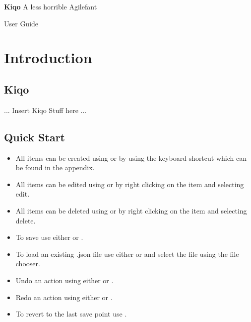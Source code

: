\documentclass[11pt,fleqn]{book} %
\begin{document}

\begingroup
\thispagestyle{empty}
\centering
\vspace*{5cm}
\par\normalfont\fontsize{35}{35}\sffamily\selectfont
\textbf{Kiqo}
{\LARGE A less horrible Agilefant}\par %
\vspace*{1cm}
{\Huge User Guide}\par %
\endgroup


\tableofcontents %

\chapter{Introduction}

\section{Kiqo}
... Insert Kiqo Stuff here ...

\section{Quick Start}
\begin{itemize}
    \item All items can be created using  or by using the keyboard shortcut which can be found
    in the appendix.
    \item All items can be edited using  or by right clicking on the item and selecting edit.
    \item All items can be deleted using  or by right clicking on the item and selecting delete.
    \item To save use either  or .
    \item To load an existing .json file use either  or  and select the file using the file chooser.
    \item Undo an action using either  or .
    \item Redo an action using either  or .
    \item To revert to the last save point use .
\end{itemize}
\end{document}
